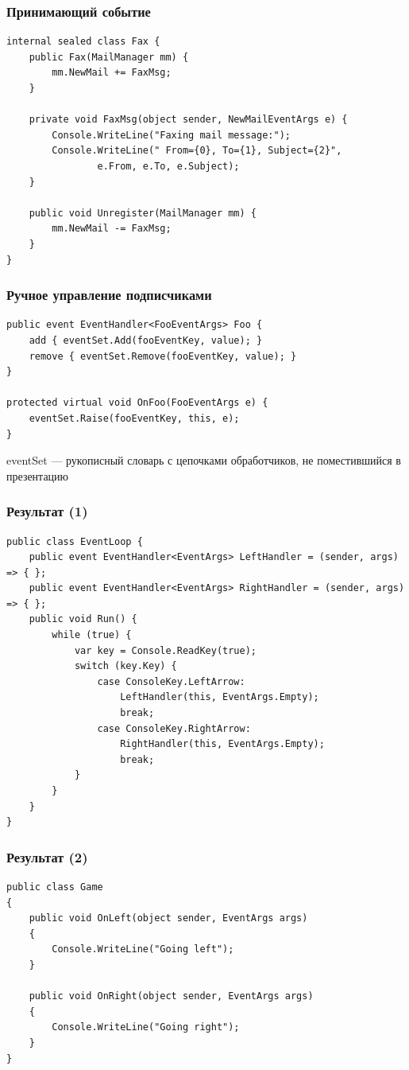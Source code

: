 \documentclass[xetex,mathserif,serif]{beamer}
\begin{document}
	\begin{frame}[fragile]
		\frametitle{Принимающий событие}
		\begin{verbatim}
internal sealed class Fax {
    public Fax(MailManager mm) {
        mm.NewMail += FaxMsg;
    }

    private void FaxMsg(object sender, NewMailEventArgs e) {
        Console.WriteLine("Faxing mail message:");
        Console.WriteLine(" From={0}, To={1}, Subject={2}",
                e.From, e.To, e.Subject);
    }

    public void Unregister(MailManager mm) {
        mm.NewMail -= FaxMsg;
    }
}
		\end{verbatim}
	\end{frame}

	\begin{frame}[fragile]
		\frametitle{Ручное управление подписчиками}
		\begin{verbatim}
public event EventHandler<FooEventArgs> Foo {
    add { eventSet.Add(fooEventKey, value); }
    remove { eventSet.Remove(fooEventKey, value); }
}

protected virtual void OnFoo(FooEventArgs e) {
    eventSet.Raise(fooEventKey, this, e);
}
		\end{verbatim}
		\vspace{7mm}
		eventSet --- рукописный словарь с цепочками обработчиков, не поместившийся в презентацию
	\end{frame}

	\begin{frame}[fragile]
		\frametitle{Результат (1)}
		\begin{footnotesize}
			\begin{verbatim}
public class EventLoop {
    public event EventHandler<EventArgs> LeftHandler = (sender, args) => { };
    public event EventHandler<EventArgs> RightHandler = (sender, args) => { };
    public void Run() {
        while (true) {
            var key = Console.ReadKey(true);
            switch (key.Key) {
                case ConsoleKey.LeftArrow:
                    LeftHandler(this, EventArgs.Empty);
                    break;
                case ConsoleKey.RightArrow:
                    RightHandler(this, EventArgs.Empty);
                    break;
            }
        }
    }
}
			\end{verbatim}
		\end{footnotesize}
	\end{frame}

	\begin{frame}[fragile]
		\frametitle{Результат (2)}
		\begin{footnotesize}
			\begin{verbatim}
public class Game
{
    public void OnLeft(object sender, EventArgs args)
    {
        Console.WriteLine("Going left");
    }

    public void OnRight(object sender, EventArgs args)
    {
        Console.WriteLine("Going right");
    }
}
			\end{verbatim}
		\end{footnotesize}
	\end{frame}
\end{document}
